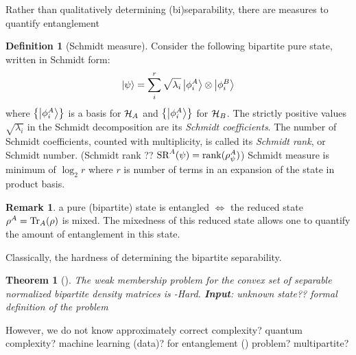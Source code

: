 \documentclass[
10pt,
aps,
pra,
linenumbers,
floatfix,
]{revtex4-2}
\theoremstyle{plain}
\newtheorem{theorem}{Theorem}
\newtheorem{question}{Question}
\theoremstyle{definition}
\newtheorem{definition}{Definition}
\newtheorem{remark}{Remark}
\newcommand{\dm}{\rho}
\begin{document}
Rather than qualitatively determining (bi)separability, there are measures to quantify entanglement
\begin{definition}[Schmidt measure]\label{def:schmidt_measure}
	Consider the following bipartite pure state, written in Schmidt form:
	\begin{equation}
		\ket{\psi} = \sum_i^r \sqrt{\lambda_i} \ket{\phi_i^A}\otimes\ket{\phi_i^B}
		\label{eq:schmidt_decomposition}
	\end{equation}
	where $\qty{\ket{\phi_i^A}}$ is a basis for $\mathcal{H}_A$ and $\qty{\ket{\phi_i^A}}$ for $\mathcal{H}_B$.
	The strictly positive values $\sqrt{\lambda_i}$ in the Schmidt decomposition are its \emph{Schmidt coefficients}. 
	The number of Schmidt coefficients, counted with multiplicity, is called its \emph{Schmidt rank}, or Schmidt number. (Schmidt rank ?? $\text{SR}^A(\psi)=\rank(\rho_{\psi}^A)$)
	Schmidt measure is minimum of $\log_2 r$ where $r$ is number of terms in an expansion of the state in product basis.
\end{definition}



\begin{remark}
	a pure (bipartite) state is entangled $\iff$ the reduced state $\dm^A=\Tr_A(\dm)$ is mixed.
	The mixedness of this reduced state allows one to quantify the amount of entanglement in this state.
\end{remark}

Classically, the hardness of determining the bipartite separability.
\begin{theorem}[\cite{gurvitsClassicalDeterministicComplexity2003}]
	The weak membership problem for the convex set of separable normalized bipartite density matrices is -Hard.
	\textbf{Input}: unknown state?? formal definition of the problem
	\cite{ioannouComputationalComplexityQuantum2007}
\end{theorem}
	However, we do not know 
	approximately correct complexity? quantum complexity? machine learning (data)? for entanglement () problem? multipartite?
\end{document}
